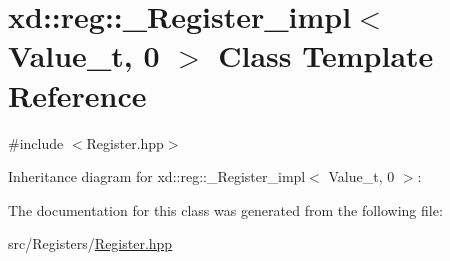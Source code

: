 \hypertarget{classxd_1_1reg_1_1___register__impl_3_01_value__t_00_010_01_4}{}\section{xd\+:\+:reg\+:\+:\+\_\+\+Register\+\_\+impl$<$ Value\+\_\+t, 0 $>$ Class Template Reference}
\label{classxd_1_1reg_1_1___register__impl_3_01_value__t_00_010_01_4}


{\ttfamily \#include $<$Register.\+hpp$>$}



Inheritance diagram for xd\+:\+:reg\+:\+:\+\_\+\+Register\+\_\+impl$<$ Value\+\_\+t, 0 $>$\+:


The documentation for this class was generated from the following file\+:\begin{DoxyCompactItemize}
\item 
src/\+Registers/\mbox{\hyperlink{_register_8hpp}{Register.\+hpp}}\end{DoxyCompactItemize}
